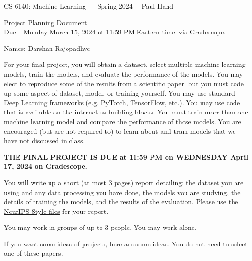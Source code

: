 \documentclass[11pt]{article}
\newcommand{\yournames}{Darshan Rajopadhye}
\newcommand{\hwdue}{Monday March 15, 2024 at 11:59 PM Eastern time}
\theoremstyle{definition}
\newcommand{\instructor}{Paul Hand}
\theoremstyle{theorem}
\begin{document}
{\Large 
\begin{center}CS 6140: Machine Learning --- Spring 2024--- \instructor \end{center}}
{\large
\vspace{10pt}
\noindent Project Planning Document \vspace{2pt}\\
Due: ~\hwdue \ via Gradescope}.

\bigskip
{\large
\noindent Names: \yournames \vspace{2pt}}

\vspace{15pt}

\noindent 

 For your final project, you will obtain a dataset, select multiple machine learning models, train the models, and evaluate the performance of the models.  You may elect to reproduce some of the results from a scientific paper, but you must code up some aspect of dataset, model, or training yourself.  You may use standard Deep Learning frameworks (e.g. PyTorch, TensorFlow, etc.).  You may use code that is available on the internet as building blocks.  You must train more than one machine learning model and compare the performance of those models.  You are encouraged (but are not required to) to learn about and train models that we have not discussed in class.
 
 \textbf{THE FINAL PROJECT IS DUE at 11:59 PM on WEDNESDAY April 17, 2024 on Gradescope.}
 
 
You will write up a short (at most 3 pages) report detailing: the dataset you are using and any data processing you have done, the models you are studying, the details of training the models, and the results of the evaluation.  Please use the \href{https://neurips.cc/Conferences/2023/PaperInformation/StyleFiles}{NeurIPS Style files} for your report.

You may work in groups of up to 3 people.  You may work alone.

If you want some ideas of projects, here are some ideas.  You do not need to select one of these papers.
\end{document}
